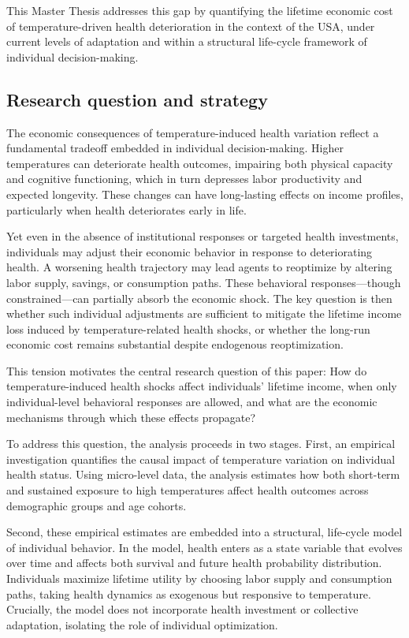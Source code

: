 \documentclass{article}
\begin{document}
This Master Thesis addresses this gap by quantifying
the lifetime economic cost of temperature-driven health
deterioration in the context of the USA,
under current levels of adaptation and within a
structural life-cycle framework of individual decision-making.

\subsection{Research question and strategy}

The economic consequences of temperature-induced health variation reflect a fundamental tradeoff embedded in individual decision-making. Higher temperatures can deteriorate health outcomes, impairing both physical capacity and cognitive functioning, which in turn depresses labor productivity and expected longevity. These changes can have long-lasting effects on income profiles, particularly when health deteriorates early in life.

Yet even in the absence of institutional responses or targeted health investments, individuals may adjust their economic behavior in response to deteriorating health. A worsening health trajectory may lead agents to reoptimize by altering labor supply, savings, or consumption paths. These behavioral responses—though constrained—can partially absorb the economic shock. The key question is then whether such individual adjustments are sufficient to mitigate the lifetime income loss induced by temperature-related health shocks, or whether the long-run economic cost remains substantial despite endogenous reoptimization.

This tension motivates the central research question of this paper:
How do temperature-induced health shocks affect individuals’ lifetime income, when only individual-level behavioral responses are allowed, and what are the economic mechanisms through which these effects propagate?

To address this question, the analysis proceeds in two stages.
First, an empirical investigation quantifies the causal impact of temperature variation on individual health status.
Using micro-level data, the analysis estimates how both short-term and sustained exposure to high temperatures affect health outcomes across demographic groups and age cohorts.

Second, these empirical estimates are embedded into a structural, life-cycle model of individual behavior.
In the model, health enters as a state variable that evolves over time and affects both survival and future health probability distribution.
Individuals maximize lifetime utility by choosing labor supply and consumption paths, taking health dynamics as exogenous but responsive to temperature.
Crucially, the model does not incorporate health investment or collective adaptation, isolating the role of individual optimization.
\end{document}
